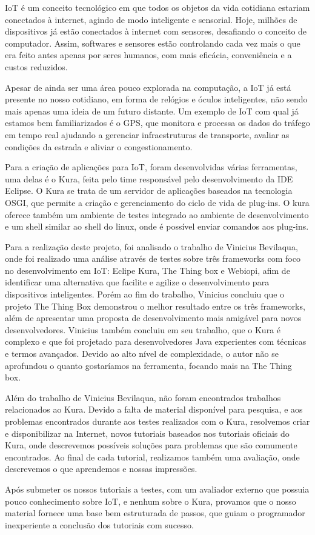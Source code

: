 IoT é um conceito tecnológico em que todos os objetos da vida cotidiana estariam conectados à internet, agindo de modo inteligente e sensorial. Hoje, milhões de dispositivos já estão conectados à internet com sensores, desafiando o conceito de computador. Assim, softwares e sensores estão controlando cada vez mais o que era feito antes apenas por seres humanos, com mais eficácia, conveniência e a custos reduzidos.

Apesar de ainda ser uma área pouco explorada na computação, a IoT já está presente no nosso cotidiano, em forma de relógios e óculos inteligentes, não sendo mais apenas uma ideia de um futuro distante. Um exemplo de IoT com qual já estamos bem familiarizados é o GPS, que monitora e processa os dados do tráfego em tempo real ajudando a gerenciar infraestruturas de transporte, avaliar as condições da estrada e aliviar o congestionamento.

Para a criação de aplicações para IoT, foram desenvolvidas várias ferramentas, uma delas é o Kura, feita pelo time responsável pelo desenvolvimento da IDE Eclipse. O Kura se trata de um servidor de aplicações baseados na tecnologia OSGI, que permite a criação e gerenciamento do ciclo de vida de plug-ins. O kura oferece também um ambiente de testes integrado ao ambiente de desenvolvimento e um shell similar ao shell do linux, onde é possível enviar comandos aos plug-ins.

Para a realização deste projeto, foi analisado o trabalho de Vinicius Bevilaqua, onde foi realizado uma análise através de testes sobre três frameworks com foco no desenvolvimento em IoT: Eclipe Kura, The Thing box e Webiopi, afim de identificar uma alternativa que facilite e agilize o desenvolvimento para dispositivos inteligentes. Porém ao fim do trabalho, Vinicius concluiu que o projeto The Thing Box demonstrou o melhor resultado entre os três frameworks, além de apresentar uma proposta de desenvolvimento mais amigável para novos desenvolvedores. Vinicius também concluiu em seu trabalho, que o Kura é complexo e que foi projetado para desenvolvedores Java experientes com técnicas e termos avançados. Devido ao alto nível de complexidade, o autor não se aprofundou o quanto gostaríamos na ferramenta, focando mais na The Thing box.

Além do trabalho de Vinicius Bevilaqua, não foram encontrados trabalhos relacionados ao Kura. Devido a falta de material disponível para pesquisa, e aos problemas encontrados durante aos testes realizados com o Kura, resolvemos criar e disponibilizar na Internet, novos tutoriais baseados nos tutoriais oficiais do Kura, onde descrevemos possíveis soluções para problemas que são comumente encontrados. Ao final de cada tutorial, realizamos também uma avaliação, onde descrevemos o que aprendemos e nossas impressões.
 

Após submeter os nossos tutoriais a testes, com um avaliador externo que possuia pouco conhecimento sobre IoT, e nenhum sobre o Kura, provamos que o nosso material fornece uma base bem estruturada de passos, que guiam o programador inexperiente a conclusão dos tutoriais com sucesso.
